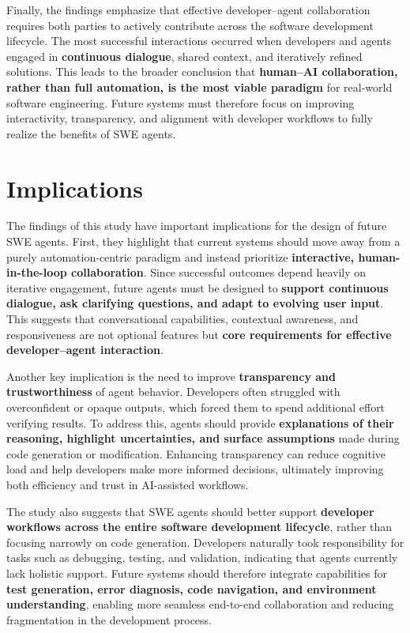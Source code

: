 Finally, the findings emphasize that effective developer–agent collaboration requires both parties to actively contribute across the software development lifecycle. The most successful interactions occurred when developers and agents engaged in \textbf{continuous dialogue}, shared context, and iteratively refined solutions. This leads to the broader conclusion that \textbf{human–AI collaboration, rather than full automation, is the most viable paradigm} for real-world software engineering. Future systems must therefore focus on improving interactivity, transparency, and alignment with developer workflows to fully realize the benefits of SWE agents.

\section{Implications}
The findings of this study have important implications for the design of future SWE agents. First, they highlight that current systems should move away from a purely automation-centric paradigm and instead prioritize \textbf{interactive, human-in-the-loop collaboration}. Since successful outcomes depend heavily on iterative engagement, future agents must be designed to \textbf{support continuous dialogue, ask clarifying questions, and adapt to evolving user input}. This suggests that conversational capabilities, contextual awareness, and responsiveness are not optional features but \textbf{core requirements for effective developer–agent interaction}.

Another key implication is the need to improve \textbf{transparency and trustworthiness} of agent behavior. Developers often struggled with overconfident or opaque outputs, which forced them to spend additional effort verifying results. To address this, agents should provide \textbf{explanations of their reasoning, highlight uncertainties, and surface assumptions} made during code generation or modification. Enhancing transparency can reduce cognitive load and help developers make more informed decisions, ultimately improving both efficiency and trust in AI-assisted workflows.

The study also suggests that SWE agents should better support \textbf{developer workflows across the entire software development lifecycle}, rather than focusing narrowly on code generation. Developers naturally took responsibility for tasks such as debugging, testing, and validation, indicating that agents currently lack holistic support. Future systems should therefore integrate capabilities for \textbf{test generation, error diagnosis, code navigation, and environment understanding}, enabling more seamless end-to-end collaboration and reducing fragmentation in the development process.

